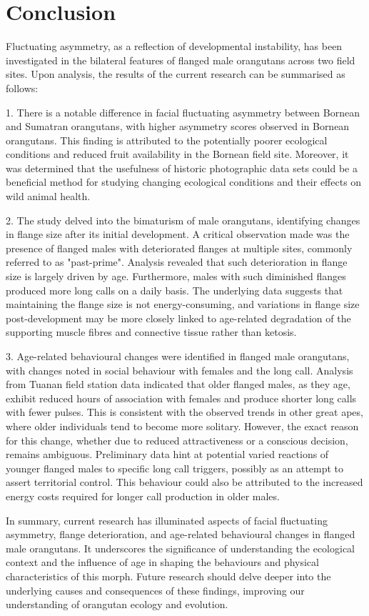 \section{Conclusion}
Fluctuating asymmetry, as a reflection of developmental instability, has been investigated in the bilateral features of flanged male orangutans across two field sites. Upon analysis, the results of the current research can be summarised as follows:

1. There is a notable difference in facial fluctuating asymmetry between Bornean and Sumatran orangutans, with higher asymmetry scores observed in Bornean orangutans. This finding is attributed to the potentially poorer ecological conditions and reduced fruit availability in the Bornean field site. Moreover, it was determined that the usefulness of historic photographic data sets could be a beneficial method for studying changing ecological conditions and their effects on wild animal health.

2. The study delved into the bimaturism of male orangutans, identifying changes in flange size after its initial development. A critical observation made was the presence of flanged males with deteriorated flanges at multiple sites, commonly referred to as "past-prime". Analysis revealed that such deterioration in flange size is largely driven by age. Furthermore, males with such diminished flanges produced more long calls on a daily basis. The underlying data suggests that maintaining the flange size is not energy-consuming, and variations in flange size post-development may be more closely linked to age-related degradation of the supporting muscle fibres and connective tissue rather than ketosis.

3. Age-related behavioural changes were identified in flanged male orangutans, with changes noted in social behaviour with females and the long call. Analysis from Tuanan field station data indicated that older flanged males, as they age, exhibit reduced hours of association with females and produce shorter long calls with fewer pulses. This is consistent with the observed trends in other great apes, where older individuals tend to become more solitary. However, the exact reason for this change, whether due to reduced attractiveness or a conscious decision, remains ambiguous. Preliminary data hint at potential varied reactions of younger flanged males to specific long call triggers, possibly as an attempt to assert territorial control. This behaviour could also be attributed to the increased energy costs required for longer call production in older males.

In summary, current research has illuminated aspects of facial fluctuating asymmetry, flange deterioration, and age-related behavioural changes in flanged male orangutans. It underscores the significance of understanding the ecological context and the influence of age in shaping the behaviours and physical characteristics of this morph. Future research should delve deeper into the underlying causes and consequences of these findings, improving our understanding of orangutan ecology and evolution.
